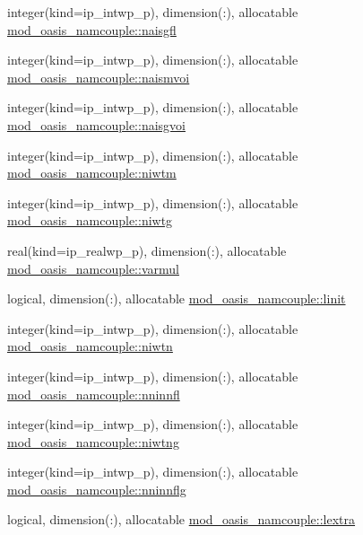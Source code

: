 \begin{DoxyCompactItemize}
\item 
integer(kind=ip\+\_\+intwp\+\_\+p), dimension(\+:), allocatable \hyperlink{namespacemod__oasis__namcouple_ada0ad7614eba9cc3a1e168484a520c33}{mod\+\_\+oasis\+\_\+namcouple\+::naisgfl}
\item 
integer(kind=ip\+\_\+intwp\+\_\+p), dimension(\+:), allocatable \hyperlink{namespacemod__oasis__namcouple_ae3d7c72b2f2f3ece9583cc0b25edbaba}{mod\+\_\+oasis\+\_\+namcouple\+::naismvoi}
\item 
integer(kind=ip\+\_\+intwp\+\_\+p), dimension(\+:), allocatable \hyperlink{namespacemod__oasis__namcouple_a87c0bb7c0a2cccbb673dcaf35e3dec50}{mod\+\_\+oasis\+\_\+namcouple\+::naisgvoi}
\item 
integer(kind=ip\+\_\+intwp\+\_\+p), dimension(\+:), allocatable \hyperlink{namespacemod__oasis__namcouple_a90e4ce86f77bf89c71a9277ff9b5dcbb}{mod\+\_\+oasis\+\_\+namcouple\+::niwtm}
\item 
integer(kind=ip\+\_\+intwp\+\_\+p), dimension(\+:), allocatable \hyperlink{namespacemod__oasis__namcouple_a28e887d61cc4b10c00c33a7d0f51a275}{mod\+\_\+oasis\+\_\+namcouple\+::niwtg}
\item 
real(kind=ip\+\_\+realwp\+\_\+p), dimension(\+:), allocatable \hyperlink{namespacemod__oasis__namcouple_ab7c38fd6bd90bb8e6ebfb539ead1f1a9}{mod\+\_\+oasis\+\_\+namcouple\+::varmul}
\item 
logical, dimension(\+:), allocatable \hyperlink{namespacemod__oasis__namcouple_ac124af3aecadc7ba436f2ee6caffee9a}{mod\+\_\+oasis\+\_\+namcouple\+::linit}
\item 
integer(kind=ip\+\_\+intwp\+\_\+p), dimension(\+:), allocatable \hyperlink{namespacemod__oasis__namcouple_a63c2f2977f9cc4839f6bdec7bbbc5fa7}{mod\+\_\+oasis\+\_\+namcouple\+::niwtn}
\item 
integer(kind=ip\+\_\+intwp\+\_\+p), dimension(\+:), allocatable \hyperlink{namespacemod__oasis__namcouple_a579387e570e26f2d6c6c2159824cf8a3}{mod\+\_\+oasis\+\_\+namcouple\+::nninnfl}
\item 
integer(kind=ip\+\_\+intwp\+\_\+p), dimension(\+:), allocatable \hyperlink{namespacemod__oasis__namcouple_a3379333e7d0f24b776c81b1087f3a3b4}{mod\+\_\+oasis\+\_\+namcouple\+::niwtng}
\item 
integer(kind=ip\+\_\+intwp\+\_\+p), dimension(\+:), allocatable \hyperlink{namespacemod__oasis__namcouple_a6526a92cd5fa662f9da229806d062dc2}{mod\+\_\+oasis\+\_\+namcouple\+::nninnflg}
\item 
logical, dimension(\+:), allocatable \hyperlink{namespacemod__oasis__namcouple_a2febd0d97dea9ecc3ce4a8c5088a8d1f}{mod\+\_\+oasis\+\_\+namcouple\+::lextra}

\end{DoxyCompactItemize}
